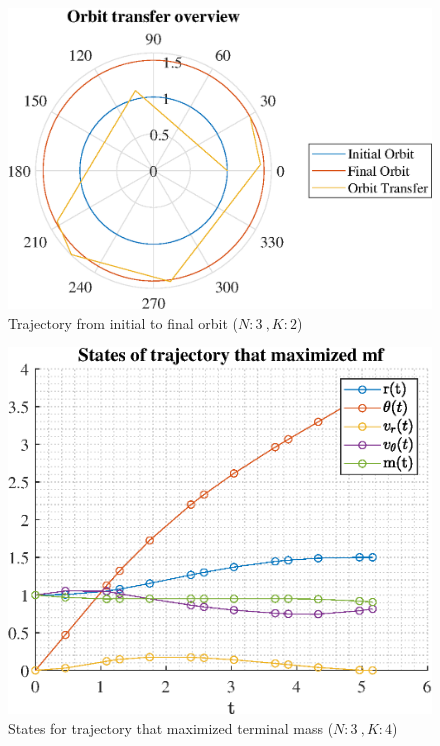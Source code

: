 \documentclass[]{article}
\begin{document}
	\begin{figure}
		\centering
		\includegraphics[scale=0.75]{orbit_N3_K2_C2_mf.eps}
		\caption{Trajectory from initial to final orbit (\(N:3\ , K:2\))}
		\label{fig:orbit_N3_K2_C2_mf}
	\end{figure}
	\begin{figure}
		\centering
		\includegraphics[scale=0.75]{states_N3_K4_C2_mf.eps}
		\caption{States for trajectory that maximized terminal mass (\(N:3\ , K:4\))}
		\label{fig:states_N3_K4_C2_mf}
	\end{figure}
\end{document}
